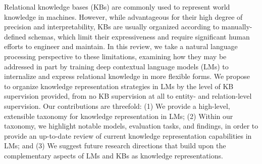 Relational knowledge bases (KBs) are commonly used to represent world knowledge in machines. However, while advantageous for their high degree of precision and interpretability, KBs are usually organized according to manually-defined schemas, which limit their expressiveness and require significant human efforts to engineer and maintain. In this review, we take a natural language processing perspective to these limitations, examining how they may be addressed in part by training deep contextual language models (LMs) to internalize and express relational knowledge in more flexible forms. We propose to organize knowledge representation strategies in LMs by the level of KB supervision provided, from no KB supervision at all to entity- and relation-level supervision. Our contributions are threefold: (1) We provide a high-level, extensible taxonomy for knowledge representation in LMs; (2) Within our taxonomy, we highlight notable models, evaluation tasks, and findings, in order to provide an up-to-date review of current knowledge representation capabilities in LMs; and (3) We suggest future research directions that build upon the complementary aspects of LMs and KBs as knowledge representations.
